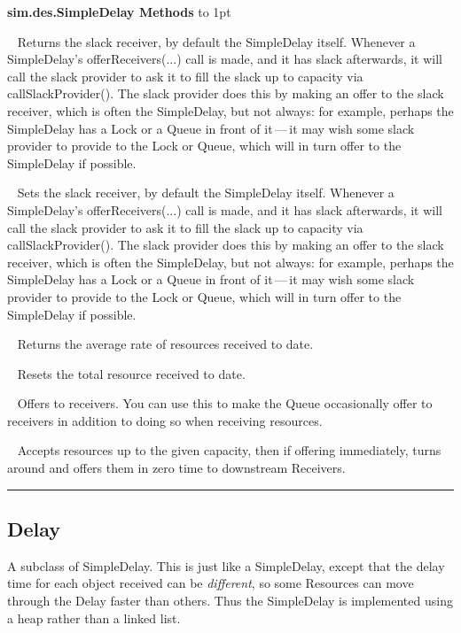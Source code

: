 \documentclass[twoside,10pt]{article}
\newcommand\class[1]{\index{Classes!{#1}}\textsf{#1}}
\newcommand*{\xfill}[1][0pt]{%
	\cleaders
		\hbox to 1pt{\hss
			\raisebox{#1}{\rule{1.2pt}{0.4pt}}%
			\hss}\hfill}
\newenvironment{methods}[1]{
\vspace{1.0em}\noindent\textsf{\textbf{#1 Methods}}\quad \xfill[0.5ex]
\vspace{-0.25em}
\begin{description}
\small}
{\end{description}\hrule\vspace{1.5em}}
\newcommand{\mthd}[1]{\item[{\sf #1}]~\newline}
\begin{document}
\begin{methods}{\class{sim.des.SimpleDelay}}
\mthd{public Receiver getSlackReceiver()}
Returns the slack receiver, by default the SimpleDelay itself.  Whenever a SimpleDelay's offerReceivers(...) call is made, and it has slack afterwards,
    	it will call the slack provider to ask it to fill the slack up to capacity via callSlackProvider().  The slack provider does this by making an offer to the slack receiver, which is often the SimpleDelay,
    	but not always: for example, perhaps the SimpleDelay has a Lock or a Queue in front of it\,---\,it may wish some
    	slack provider to provide to the Lock or Queue, which will in turn offer to the SimpleDelay if possible.  

\mthd{public void setSlackReceiver(Receiver provider)}
         Sets the slack receiver, by default the SimpleDelay itself.  Whenever a SimpleDelay's offerReceivers(...) call is made, and it has slack afterwards,
    	it will call the slack provider to ask it to fill the slack up to capacity via callSlackProvider().  The slack provider does this by making an offer to the slack receiver, which is often the SimpleDelay,
    	but not always: for example, perhaps the SimpleDelay has a Lock or a Queue in front of it\,---\,it may wish some
    	slack provider to provide to the Lock or Queue, which will in turn offer to the SimpleDelay if possible.

        
\mthd{public double getReceiverResourceRate()}
Returns the average rate of resources received to date.
\mthd{public void reset(SimState state)}
Resets the total resource received to date.
\mthd{public void step(SimState state)}
Offers to receivers.  You can use this to make the Queue occasionally offer to receivers in addition to doing so when receiving resources.
\mthd{public boolean accept(Provider provider, Resource amount, double atLeast, double atMost)}
Accepts resources up to the given capacity, then if offering immediately, turns around and offers them in zero time to downstream Receivers.
\end{methods}

\subsection{Delay}

A subclass of SimpleDelay.  This is just like a SimpleDelay, except that the delay time for each object received can be {\it different}, so some Resources can move through the Delay faster than others.  Thus the SimpleDelay is implemented using a heap rather than a linked list.
\end{document}
